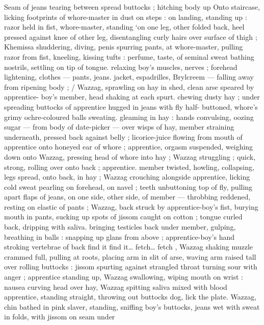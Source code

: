 Seam of jeans tearing between spread buttocks ; hitching body up 
Onto staircase, licking footprints of whore-master in dust on steps : 
on landing, standing up : razor held in fist, whore-master, standing 
‘on one leg, other folded back, heel pressed against knee of other 
leg, disentangling curly hairs over surface of thigh ; Khemissa 
shuddering, diving, penis spurring pants, at whore-master, pulling 
razor from fist, kneeling, kissing tufts : perfume, taste, of seminal 
sweat bathing nostrils, settling on tip of tongue. relaxing boy's 
muscles, nerves ; forehead lightening, clothes --- pants, jeans. 
jacket, espadrilles, Brylcreem --- falling away from ripening body ; {\slash} 
Wazzag, sprawling on hay in shed, clean arse speared by apprentice- 
boy's member, head shaking at each spurt. chewing dusty hay ; 
under spreading buttocks of apprentice hugged in jeans with fly half- 
buttoned, whore's grimy ochre-coloured balls sweating. gleaming in 
hay : hands convulsing, oozing sugar --- from body of date-picker --- 
over wisps of hay, member straining underneath, pressed back 
against belly ; licorice-juice flowing from mouth of apprentice onto 
honeyed ear of whore ; apprentice, orgasm suspended, weighing 
down onto Wazzag, pressing head of whore into hay ; Wazzag 
struggling ; quick, strong, rolling over onto back ; apprentice. 
member twisted, howling, collapsing, legs spread, onto back, in hay 
; Wazzag crouching alongside apprentice, licking cold sweat pearling 
on forehead, on navel ; teeth unbuttoning top of fly, pulling apart 
flaps of jeans, on one side, other side, of member --- throbbing 
reddened, resting on elastic of pants ; Wazzag, back struck by 
apprentice-boy's fist, burying mouth in pants, sucking up spots of 
jissom caught on cotton ; tongue curled back, dripping with saliva. 
bringing testicles back under member, gulping, breathing in balls : 
snapping up glans from above ; apprentice-boy's hand stroking 
vertebrae of back{\td} {\gl} find it{\td} find it{\ldots} fetch{\ldots} fetch{\td} {\gr}, Wazzag 
shaking muzzle crammed full, pulling at roots, placing arm in slit of 
arse, waving arm raised tall over rolling buttocks : jissom spurting 
against strangled throat turning sour with anger ; apprentice 
standing up, Wazzag swallowing, wiping mouth on wrist : nausea 
curving head over hay, Wazzag spitting saliva mixed with blood 
apprentice, standing straight, throwing out buttocks{\td} {\gl} dog, lick the 
plate.{\gr} Wazzag, chin bathed in pink slaver, standing, sniffing boy's 
buttocks, jeans wet with sweat in folds, with jissom on seam under 
